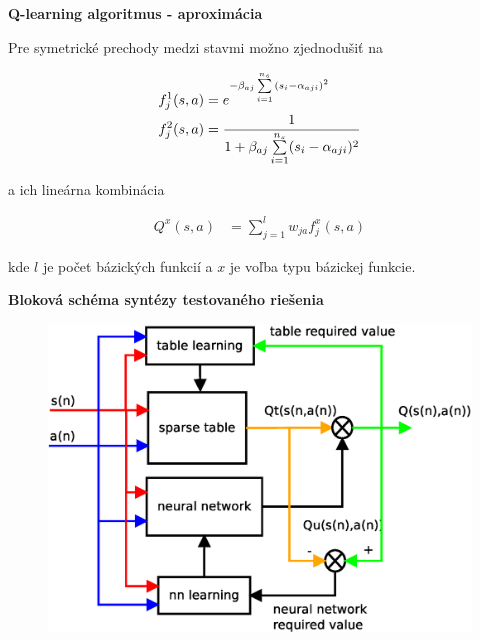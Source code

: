 \documentclass[xcolor=dvipsnames]{beamer}
\begin{document}
\begin{frame}{\bf Q-learning algoritmus - aproximácia}

Pre symetrické prechody medzi stavmi možno zjednodušiť na

\begin{align*}
f_j^1(\boldmath{s, a}) &= e^{ -\beta_{aj} \sum\limits_{i=1}^{n_s}{(s_i - \alpha_{aji})^2} }  \\
f_j^2(\boldmath{s, a}) &= \frac{1}{1 + {\beta_{aj} \sum\limits_{i=1}^{n_s}(s_i - \alpha_{aji})^2}}  \\
\end{align*}

a ich lineárna kombinácia

\begin{align}
    Q^x(s, a)&= \sum\limits_{j=1}^{l}w_{j a}f^x_{j}(s, a) \nonumber
\end{align}

kde $l$ je počet bázických funkcií a $x$ je voľba typu bázickej funkcie.



\end{frame}



\begin{frame}{\bf Bloková schéma syntézy testovaného riešenia}

\begin{figure}[!htb]
\centering
\includegraphics[scale=.4]{../diagrams/q_learning_hybrid.eps}
\end{figure}

\end{frame}
\end{document}
